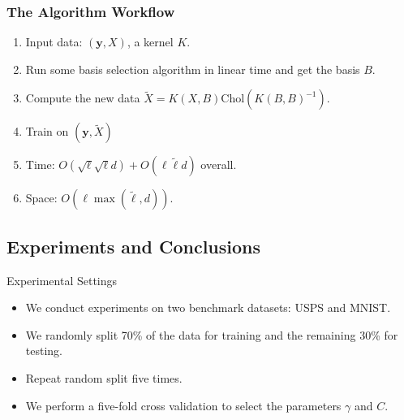 \documentclass{beamer}
\def\by{{\boldsymbol y}}
\begin{document}
\begin{frame}
  \frametitle{The Algorithm Workflow}
  \begin{enumerate}
    \item Input data: $(\by, X)$, a kernel $K$.
    \item Run some basis selection algorithm in linear time and get the basis $B$.
    \item Compute the new data $\tilde{X} = K(X, B) \text{Chol}(K(B, B)^{-1})$.
    \item Train on $(\by, \tilde{X})$
    \pause
    \item [] Time: $O(\sqrt{\ell} \sqrt{\ell} d) + O(\ell \tilde{\ell} d)$ overall.
    \item [] Space: $O(\ell \max(\tilde{\ell}, d))$.
  \end{enumerate}
\end{frame}

\subsection{Experiments and Conclusions}
\begin{frame}{Experimental Settings}
\begin{itemize}
  \item We conduct experiments on two benchmark datasets: USPS and MNIST.
  \item We randomly split 70\% of the data for training and the remaining 30\% for testing.
  \item Repeat random split five times.
  \item We perform a five-fold cross validation to select the parameters $\gamma$ and $C$.
\end{itemize}
\begin{table}
\caption{Dataset descriptions (with the number $\ell$ of instances and the dimension $d$ of the data). The sizes for storing the data $\ell d$ and the associated kernel matrices $\ell^2$ are also listed.}
\label{tab:datasets}
\end{table}
\end{frame}
\end{document}
